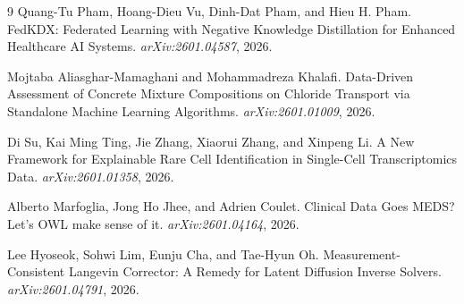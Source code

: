 \documentclass[11pt]{article}
\begin{document}
\begin{thebibliography}{9}
Quang-Tu Pham, Hoang-Dieu Vu, Dinh-Dat Pham, and Hieu H. Pham. FedKDX: Federated Learning with Negative Knowledge Distillation for Enhanced Healthcare AI Systems. \emph{arXiv:2601.04587}, 2026.

Mojtaba Aliasghar-Mamaghani and Mohammadreza Khalafi. Data-Driven Assessment of Concrete Mixture Compositions on Chloride Transport via Standalone Machine Learning Algorithms. \emph{arXiv:2601.01009}, 2026.

Di Su, Kai Ming Ting, Jie Zhang, Xiaorui Zhang, and Xinpeng Li. A New Framework for Explainable Rare Cell Identification in Single-Cell Transcriptomics Data. \emph{arXiv:2601.01358}, 2026.

Alberto Marfoglia, Jong Ho Jhee, and Adrien Coulet. Clinical Data Goes MEDS? Let's OWL make sense of it. \emph{arXiv:2601.04164}, 2026.

Lee Hyoseok, Sohwi Lim, Eunju Cha, and Tae-Hyun Oh. Measurement-Consistent Langevin Corrector: A Remedy for Latent Diffusion Inverse Solvers. \emph{arXiv:2601.04791}, 2026.
\end{thebibliography}
\end{document}
